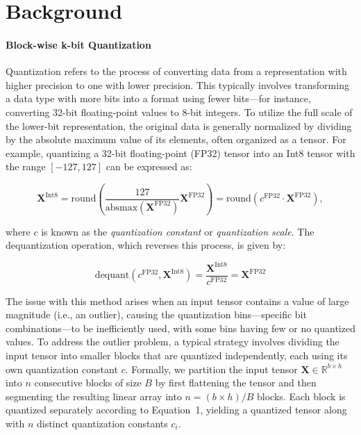\section{Background}
\paragraph{Block-wise k-bit Quantization} Quantization refers to the process of converting data from a representation with higher precision to one with lower precision. This typically involves transforming a data type with more bits into a format using fewer bits—for instance, converting 32-bit floating-point values to 8-bit integers. To utilize the full scale of the lower-bit representation, the original data is generally normalized by dividing by the absolute maximum value of its elements, often organized as a tensor. For example, quantizing a 32-bit floating-point (FP32) tensor into an Int8 tensor with the range $[-127, 127]$ can be expressed as:

\begin{equation}
    \mathbf{X}^{ \text{Int8}} = \text{round}\left( \frac{127}{{\text{absmax}}(\mathbf{X}^{{\text{FP32}}})}\mathbf{X}^{{\text{FP32}}} \right) = \text{round}(c^{\text{FP32}}\cdot \mathbf{X}^{{\text{FP32}}}),
\end{equation}

where $c$ is known as the {\em quantization constant} or {\em quantization scale}. The dequantization operation, which reverses this process, is given by:

\begin{equation}
    \text{dequant}(c^{\text{FP32}}, \mathbf{X}^{\text{Int8}}) = \frac{\mathbf{X}^{\text{Int8}}}{c^{\text{FP32}}} = \mathbf{X}^{\text{FP32}}
\end{equation}

The issue with this method arises when an input tensor contains a value of large magnitude (i.e., an outlier), causing the quantization bins—specific bit combinations—to be inefficiently used, with some bins having few or no quantized values. To address the outlier problem, a typical strategy involves dividing the input tensor into smaller blocks that are quantized independently, each using its own quantization constant $c$. Formally, we partition the input tensor $\mathbf{X}\in \mathbb{R}^{b\times h}$ into $n$ consecutive blocks of size $B$ by first flattening the tensor and then segmenting the resulting linear array into ${n = ({b\times h} )/{B} }$ blocks. Each block is quantized separately according to Equation~1, yielding a quantized tensor along with $n$ distinct quantization constants $c_i$.

